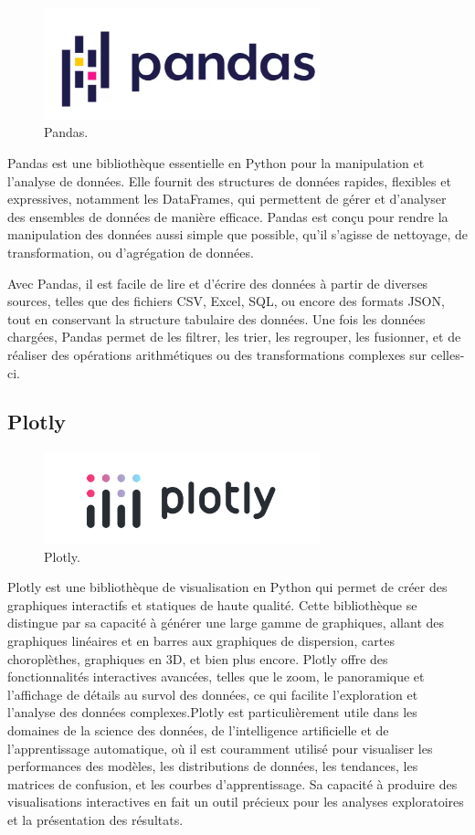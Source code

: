 \begin{figure}[hbt!]
  \centering
  \includegraphics[width=8cm]{images_pfe/pandas.png}
  \caption{Pandas.}
  \label{fig:Pandas}
\end{figure}
\FloatBarrier
\medskip

Pandas est une bibliothèque essentielle en Python pour la manipulation et
l'analyse de données. Elle fournit des structures de données rapides, flexibles
et expressives, notamment les DataFrames, qui permettent de gérer et d'analyser
des ensembles de données de manière efficace. Pandas est conçu pour rendre la
manipulation des données aussi simple que possible, qu'il s'agisse de
nettoyage, de transformation, ou d'agrégation de données.

Avec Pandas, il est facile de lire et d'écrire des données à partir de diverses
sources, telles que des fichiers CSV, Excel, SQL, ou encore des formats JSON,
tout en conservant la structure tabulaire des données. Une fois les données
chargées, Pandas permet de les filtrer, les trier, les regrouper, les
fusionner, et de réaliser des opérations arithmétiques ou des transformations
complexes sur celles-ci.

\subsection{Plotly}
\begin{figure}[hbt!]
  \centering
  \includegraphics[width=8cm]{images_pfe/Plotly-logo.png}
  \caption{Plotly.}
  \label{fig:Plotly}
\end{figure}
\FloatBarrier
\medskip

Plotly est une bibliothèque de visualisation en Python qui permet de créer des
graphiques interactifs et statiques de haute qualité. Cette bibliothèque se
distingue par sa capacité à générer une large gamme de graphiques, allant des
graphiques linéaires et en barres aux graphiques de dispersion, cartes
choroplèthes, graphiques en 3D, et bien plus encore. Plotly offre des
fonctionnalités interactives avancées, telles que le zoom, le panoramique et
l'affichage de détails au survol des données, ce qui facilite l'exploration et
l'analyse des données complexes.Plotly est particulièrement utile dans les
domaines de la science des données, de l'intelligence artificielle et de
l'apprentissage automatique, où il est couramment utilisé pour visualiser les
performances des modèles, les distributions de données, les tendances, les
matrices de confusion, et les courbes d'apprentissage. Sa capacité à produire
des visualisations interactives en fait un outil précieux pour les analyses
exploratoires et la présentation des résultats.
